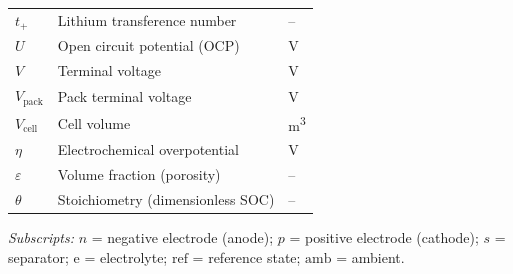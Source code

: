 \begin{longtable}{p{3.5cm} p{9cm} p{2cm}}
$t_+$ & Lithium transference number & -- \\
$U$ & Open circuit potential (OCP) & \si{\volt} \\
$V$ & Terminal voltage & \si{\volt} \\
$V_\text{pack}$ & Pack terminal voltage & \si{\volt} \\
$V_\text{cell}$ & Cell volume & \si{\meter\cubed} \\
$\eta$ & Electrochemical overpotential & \si{\volt} \\
$\varepsilon$ & Volume fraction (porosity) & -- \\
$\theta$ & Stoichiometry (dimensionless SOC) & -- \\
\bottomrule
\end{longtable}

\textit{Subscripts:} $n$ = negative electrode (anode); $p$ = positive electrode (cathode); $s$ = separator; $\text{e}$ = electrolyte; $\text{ref}$ = reference state; $\text{amb}$ = ambient.

\newpage
